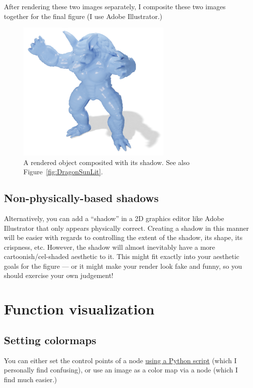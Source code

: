 \documentclass[10pt]{article}
\newcommand{\obj}[1]{\menu{\color{magenta} #1}}
\begin{document}
After rendering these two images separately, I composite these two images together for the final figure (I use Adobe Illustrator.)
\begin{figure}[H]
    \centering
    \captionsetup{width=0.8\textwidth}
    \includegraphics[width=3in]{images/final-render-with-shadow.png}
    \caption{A rendered object composited with its shadow. See also Figure~\ref{fig:DragonSunLit}.}
    \label{fig:final-render-with-shadow}
\end{figure}

\subsection{Non-physically-based shadows}
\label{sec:CartoonShadows}
Alternatively, you can add a ``shadow'' in a 2D graphics editor like Adobe Illustrator that only appears physically correct. Creating a shadow in this manner will be easier with regards to controlling the extent of the shadow, its shape, its crispness, etc. However, the shadow will almost inevitably have a more cartoonish/cel-shaded aesthetic to it. This might fit exactly into your aesthetic goals for the figure --- or it might make your render look fake and funny, so you should exercise your own judgement! %

\section{Function visualization}
\label{sec:FunctionVisualization}

\subsection{Setting colormaps}
You can either set the control points of a \obj{Color Ramp} node \href{https://blender.stackexchange.com/a/261366}{using a Python script} (which I personally find confusing), or use an image as a color map via a \obj{Image Texture} node (which I find much easier.) 
\end{document}

